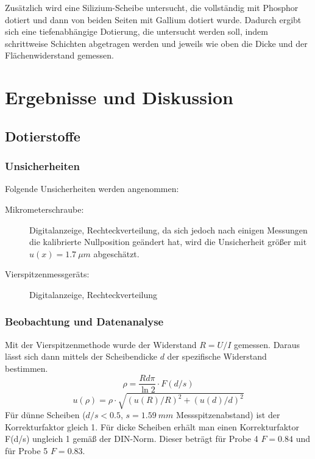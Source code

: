 \documentclass[
	a4paper,
	12pt,
	pagesize,
	ngerman
]{scrartcl}
\begin{document}
	Zusätzlich wird eine Silizium-Scheibe untersucht, die vollständig mit Phosphor dotiert und dann von beiden Seiten mit Gallium dotiert wurde.
	Dadurch ergibt sich eine tiefenabhängige Dotierung, die untersucht werden soll, indem schrittweise Schichten abgetragen werden und jeweils wie oben die Dicke und der Flächenwiderstand gemessen.

	\section{Ergebnisse und Diskussion}

	\subsection{Dotierstoffe}
	\subsubsection{Unsicherheiten}
	Folgende Unsicherheiten werden angenommen:
	\begin{description}
		\item[Mikrometerschraube:]  Digitalanzeige, Rechteckverteilung, da sich jedoch nach einigen Messungen die kalibrierte Nullposition geändert hat, wird die Unsicherheit größer mit $u(x)=\SI{1.7}{\mu m}$ abgeschätzt.
		\item[Vierspitzenmessgeräts:] Digitalanzeige, Rechteckverteilung
	\end{description}
	\subsubsection{Beobachtung und Datenanalyse}

	Mit der Vierspitzenmethode wurde der Widerstand $R=U/I$ gemessen.
	Daraus lässt sich dann mittels der Scheibendicke $d$ der spezifische Widerstand bestimmen.
	\begin{equation}
			\rho = \frac{R d \pi}{\ln 2} \cdot F(d/s)
			\label{eq_spez_wd}
	\end{equation}
	\begin{equation}
			u(\rho) = \rho\cdot\sqrt{(u(R)/R)^2 + (u(d)/d)^2}
	\end{equation}
	Für dünne Scheiben ($d/s<0.5$, $s=\SI{1.59}{mm}$ Messspitzenabstand) ist der Korrekturfaktor gleich 1.
	Für dicke Scheiben erhält man einen Korrekturfaktor F(d/s) ungleich 1 gemäß der DIN-Norm\cite{DIN50431}.
	Dieser beträgt für Probe 4 $F=0.84$ und für Probe 5 $F=0.83$.
\end{document}
